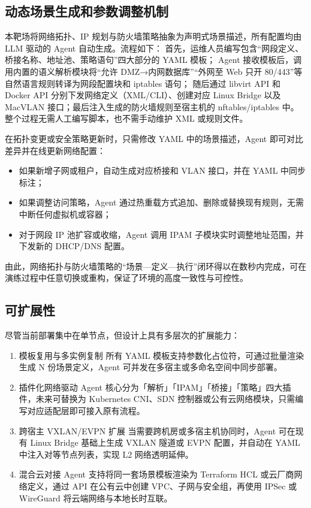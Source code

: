 \documentclass[lang=cn,10pt]{elegantbook}
\begin{document}
\subsection{动态场景生成和参数调整机制}

本靶场将网络拓扑、IP 规划与防火墙策略抽象为声明式场景描述，所有配置均由 LLM 驱动的 Agent 自动生成。流程如下：  
首先，运维人员编写包含“网段定义、桥接名称、地址池、策略语句”四大部分的 YAML 模板；  
Agent 接收模板后，调用内置的语义解析模块将“允许 DMZ→内网数据库”“外网至 Web 只开 80/443”等自然语言规则转译为网段配置块和 iptables 语句；  
随后通过 libvirt API 和 Docker API 分别下发网络定义（XML/CLI）、创建对应 Linux Bridge 以及 MacVLAN 接口；最后注入生成的防火墙规则至宿主机的 nftables/iptables 中。  
整个过程无需人工编写脚本，也不需手动维护 XML 或规则文件。

在拓扑变更或安全策略更新时，只需修改 YAML 中的场景描述，Agent 即可对比差异并在线更新网络配置：  
\begin{itemize}
  \item 如果新增子网或租户，自动生成对应桥接和 VLAN 接口，并在 YAML 中同步标注；  
  \item 如果调整访问策略，Agent 通过热重载方式追加、删除或替换现有规则，无需中断任何虚拟机或容器；  
  \item 对于网段 IP 池扩容或收缩，Agent 调用 IPAM 子模块实时调整地址范围，并下发新的 DHCP/DNS 配置。  
\end{itemize}

由此，网络拓扑与防火墙策略的“场景—定义—执行”闭环得以在数秒内完成，可在演练过程中任意切换或重构，保证了环境的高度一致性与可控性。

\subsection{可扩展性}

尽管当前部署集中在单节点，但设计上具有多层次的扩展能力：

\begin{enumerate}
  \item 模板复用与多实例复制  
        所有 YAML 模板支持参数化占位符，可通过批量渲染生成 N 份场景定义，Agent 可并发在多宿主或多命名空间中同步部署。  
  \item 插件化网络驱动  
        Agent 核心分为「解析」「IPAM」「桥接」「策略」四大插件，未来可替换为 Kubernetes CNI、SDN 控制器或公有云网络模块，只需编写对应适配层即可接入原有流程。  
  \item 跨宿主 VXLAN/EVPN 扩展  
        当需要跨机房或多宿主机协同时，Agent 可在现有 Linux Bridge 基础上生成 VXLAN 隧道或 EVPN 配置，并自动在 YAML 中注入对等节点列表，实现 L2 网络透明延伸。  
  \item 混合云对接  
        Agent 支持将同一套场景模板渲染为 Terraform HCL 或云厂商网络定义，通过 API 在公有云中创建 VPC、子网与安全组，再使用 IPSec 或 WireGuard 将云端网络与本地长时互联。  
\end{enumerate}
\end{document}
